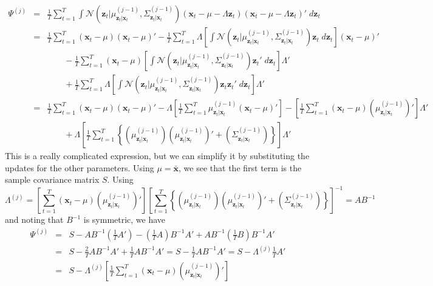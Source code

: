 \documentclass[12pt]{article}
\theoremstyle{definition}
\begin{document}
\begin{eqnarray*}
	\Psi^{(j)} &=&\frac{1}{T}\sum_{t=1}^T \int  \mathcal{N}\left(\mathbf{z}_t|\mu^{(j-1)}_{\mathbf{z}_t|\mathbf{x}_t}, \Sigma^{(j-1)}_{\mathbf{z}_t|\mathbf{x}_t}\right)(\mathbf{x}_t - \mu -  \Lambda \textbf{z}_t)(\mathbf{x}_t - \mu -  \Lambda \textbf{z}_t)' \;d \textbf{z}_t\\
		&=&\frac{1}{T}\sum_{t=1}^T  (\mathbf{x}_t - \mu)(\mathbf{x}_t - \mu)' - \frac{1}{T}\sum_{t=1}^T \Lambda \left[\int  \mathcal{N}\left(\mathbf{z}_t|\mu^{(j-1)}_{\mathbf{z}_t|\mathbf{x}_t}, \Sigma^{(j-1)}_{\mathbf{z}_t|\mathbf{x}_t}\right) \mathbf{z}_t\;d \textbf{z}_t  \right](\mathbf{x}_t - \mu)'\\
		&& \quad \quad  - \frac{1}{T}\sum_{t=1}^T  (\mathbf{x}_t - \mu)\left[\int  \mathcal{N}\left(\mathbf{z}_t|\mu^{(j-1)}_{\mathbf{z}_t|\mathbf{x}_t}, \Sigma^{(j-1)}_{\mathbf{z}_t|\mathbf{x}_t}\right) \mathbf{z}_t'\;d \textbf{z}_t  \right]\Lambda'\\
		&& \quad \quad + \frac{1}{T}\sum_{t=1}^T \Lambda \left[\int  \mathcal{N}\left(\mathbf{z}_t|\mu^{(j-1)}_{\mathbf{z}_t|\mathbf{x}_t}, \Sigma^{(j-1)}_{\mathbf{z}_t|\mathbf{x}_t}\right) \mathbf{z}_t \mathbf{z}_t'\;d \textbf{z}_t\right] \Lambda'\\
		&=& \frac{1}{T}\sum_{t=1}^T  (\mathbf{x}_t - \mu)(\mathbf{x}_t - \mu)' -\Lambda \left[\frac{1}{T} \sum_{t=1}^T  \mu^{(j-1)}_{\mathbf{z}_t|\mathbf{x}_t} (\mathbf{x}_t - \mu)'\right] -  \left[\frac{1}{T} \sum_{t=1}^T (\mathbf{x}_t - \mu)\left(\mu^{(j-1)}_{\mathbf{z}_t|\mathbf{x}_t}\right)'\right]\Lambda' \\
			&& \quad \quad + \Lambda\left[\frac{1}{T} \sum_{t=1}^T  \left\{ \left(\mu^{(j-1)}_{\mathbf{z}_t|\mathbf{x}_t}\right)\left(\mu^{(j-1)}_{\mathbf{z}_t|\mathbf{x}_t}\right)' + \left(\Sigma^{(j-1)}_{\mathbf{z}_t|\mathbf{x}_t} \right)\right\} \right]\Lambda'
\end{eqnarray*}
This is a really complicated expression, but we can simplify it by substituting the updates for the other parameters. Using $\mu = \bar{\mathbf{x}}$, we see that the first term is the sample covariance matrix $S$. Using
$$\Lambda^{(j)} = \left[\sum_{t=1}^T (\mathbf{x}_t - \mu)\left(\mu^{(j-1)}_{\mathbf{z}_t|\mathbf{x}_t} \right)'\right]\left[\sum_{t=1}^T \left\{ \left(\mu^{(j-1)}_{\mathbf{z}_t|\mathbf{x}_t} \right)\left(\mu^{(j-1)}_{\mathbf{z}_t|\mathbf{x}_t} \right)' + \left(\Sigma^{(j-1)}_{\mathbf{z}_t|\mathbf{x}_t} \right) \right\}  \right]^{-1} = AB^{-1}$$
and noting that $B^{-1}$ is symmetric, we have
\begin{eqnarray*}
	\Psi^{(j)} &=& S - AB^{-1}\left(\frac{1}{T}A'\right) - \left(\frac{1}{T} A\right)B^{-1}A' + AB^{-1}\left(\frac{1}{T}B\right)B^{-1}A'\\
	&=&S - \frac{2}{T}AB^{-1}A' + \frac{1}{T}AB^{-1}A'= S - \frac{1}{T}AB^{-1}A' =  S - \Lambda^{(j)} \frac{1}{T}A'\\
	&=& S - \Lambda^{(j)}\left[\frac{1}{T} \sum_{t=1}^T (\mathbf{x}_t - \mu)\left(\mu^{(j-1)}_{\mathbf{z}_t|\mathbf{x}_t}\right)'\right]
\end{eqnarray*}
\end{document}
